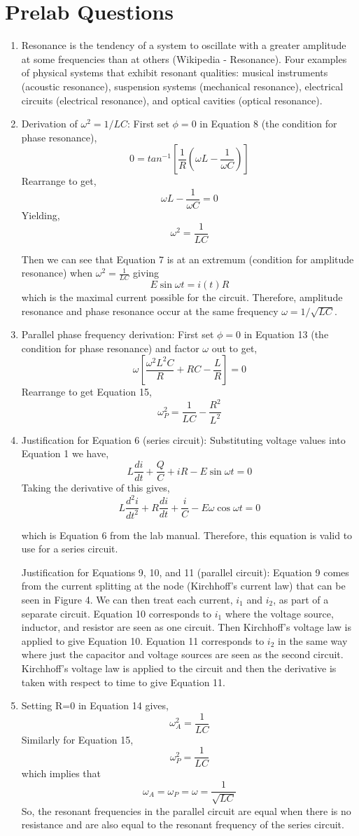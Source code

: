 \documentclass[justified]{tufte-book}
\begin{document}
\section{Prelab Questions}
\begin{enumerate}
\item Resonance is the tendency of a system to oscillate with a greater amplitude at some frequencies than at others (Wikipedia - Resonance). Four examples of physical systems that exhibit resonant qualities: musical instruments (acoustic resonance), suspension systems (mechanical resonance), electrical circuits (electrical resonance), and optical cavities (optical resonance).
\item Derivation of $\omega^2 = 1/LC$: First set $\phi=0$ in Equation 8 (the condition for phase resonance),
$$
0=tan^{-1}\left[ \frac{1}{R} \left( \omega L - \frac{1}{\omega C} \right) \right]
$$
Rearrange to get,
$$
\omega L - \frac{1}{\omega C} =0
$$
Yielding,
$$
\omega^2 = \frac{1}{LC}
$$

Then we can see that Equation 7 is at an extremum (condition for amplitude resonance) when $\omega^2 = \frac{1}{LC}$ giving
$$
E\sin\omega t = i(t)R
$$
which is the maximal current possible for the circuit. Therefore, amplitude resonance and phase resonance occur at the same frequency $\omega=1/\sqrt{LC}$.
\item Parallel phase frequency derivation: First set $\phi=0$ in Equation 13 (the condition for phase resonance) and factor $\omega$ out to get,
$$
\omega\left[\frac{\omega^2L^2C}{R}+RC-\frac{L}{R}\right]=0
$$
Rearrange to get Equation 15,
$$
\omega_P^2 = \frac{1}{LC} -\frac{R^2}{L^2}
$$
\item Justification for Equation 6 (series circuit): Substituting voltage values into Equation 1 we have,
$$
L\frac{di}{dt}+\frac{Q}{C}+iR-E\sin\omega t = 0
$$
Taking the derivative of this gives,
$$
L\frac{d^2i}{dt^2} + R\frac{di}{dt} + \frac{i}{C} - E\omega\cos\omega t = 0
$$

which is Equation 6 from the lab manual. Therefore, this equation is valid to use for a series circuit.

Justification for Equations 9, 10, and 11 (parallel circuit): Equation 9 comes from the current splitting at the node (Kirchhoff's current law) that can be seen in Figure 4. We can then treat each current, $i_1$ and $i_2$, as part of a separate circuit. Equation 10 corresponds to $i_1$ where the voltage source, inductor, and resistor are seen as one circuit. Then Kirchhoff's voltage law is applied to give Equation 10. Equation 11 corresponds to $i_2$ in the same way where just the capacitor and voltage sources are seen as the second circuit. Kirchhoff's voltage law is applied to the circuit and then the derivative is taken with respect to time to give Equation 11.
\item Setting R=0 in Equation 14 gives,
$$
\omega_A ^2 = \frac{1}{LC}
$$
Similarly for Equation 15,
$$
\omega_P ^2 = \frac{1}{LC}
$$
which implies that 
$$
\omega_A=\omega_P=\omega=\frac{1}{\sqrt{LC}}
$$
So, the resonant frequencies in the parallel circuit are equal when there is no resistance and are also equal to the resonant frequency of the series circuit.
\end{enumerate}
\end{document}
